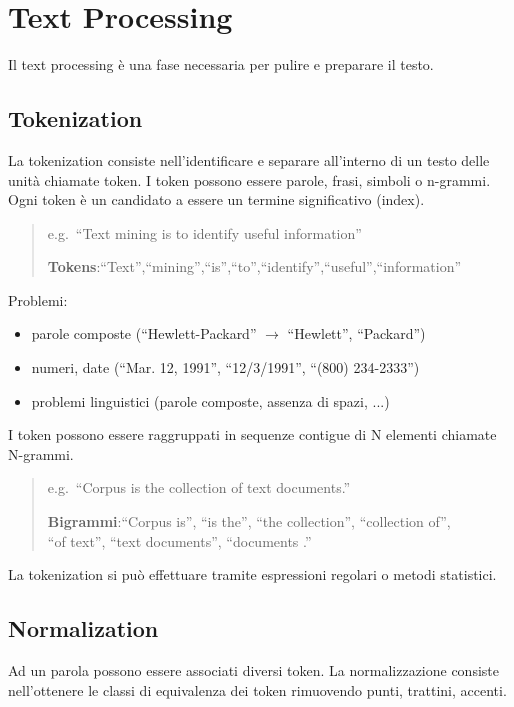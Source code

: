 \chapter{Text Processing}
Il text processing è una fase necessaria per pulire e preparare il testo.

\section{Tokenization}
La tokenization consiste nell'identificare e separare all'interno di un testo delle unità chiamate token.
I token possono essere parole, frasi, simboli o n-grammi. Ogni token è un candidato a essere un termine significativo (index).

\begin{quote}
  e.g.\ ``Text mining is to identify useful information''

  \textbf{Tokens}:``Text'',``mining'',``is'',``to'',``identify'',``useful'',``information''
\end{quote}

Problemi:
\begin{itemize}
  \item parole composte (``Hewlett-Packard'' $\rightarrow$ ``Hewlett'', ``Packard'')
  \item numeri, date (``Mar. 12, 1991'', ``12/3/1991'', ``(800) 234-2333'')
  \item problemi linguistici (parole composte, assenza di spazi, ...)
\end{itemize}

I token possono essere raggruppati in sequenze contigue di N elementi chiamate N-grammi.

\begin{quote}
  e.g.\ ``Corpus is the collection of text documents.''

  \textbf{Bigrammi}:``Corpus is'', ``is the'', ``the collection'', ``collection of'', \\``of text'', ``text documents'', ``documents .''
\end{quote}

La tokenization si può effettuare tramite espressioni regolari o metodi statistici.

\newpage

\section{Normalization}
Ad un parola possono essere associati diversi token. La normalizzazione consiste nell'ottenere le classi di equivalenza dei token rimuovendo punti, trattini, accenti.

